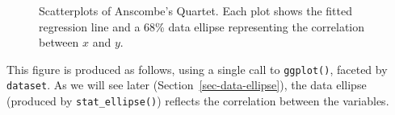 \documentclass[
  letterpaper,
  10pt,
  krantz2]{krantz}
\begin{document}
\begin{figure}


\caption{\label{fig-ch02-anscombe1}Scatterplots of Anscombe's Quartet.
Each plot shows the fitted regression line and a 68\% data ellipse
representing the correlation between \(x\) and \(y\).}

\end{figure}%

This figure is produced as follows, using a single call to
\texttt{ggplot()}, faceted by \texttt{dataset}. As we will see later
(Section~\ref{sec-data-ellipse}), the data ellipse (produced by
\texttt{stat\_ellipse()}) reflects the correlation between the
variables.
\end{document}
